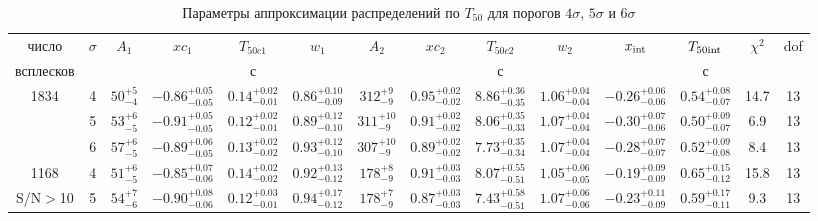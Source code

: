 \begin{table} [h]
 \centering
 \caption{Параметры аппроксимации распределений по $T_{50}$ для порогов 
          $4\sigma$, $5\sigma$ и $6\sigma$}\label{tab:T50_distr}
\scriptsize
  \begin{center}
  \begin{tabular}{c c c c c c c c c c c c c c}
  \hline
  \hline
число & $\sigma$ & $A_1$ & $xc_1$ & $T_{50c1}$ & $w_1$ & 
                             $A_2$ & $xc_2$ & $T_{50c2}$ & $w_2$ & 
							 $x_{{\mathrm{int}}}$ & $T_{50{\mathrm{int}}}$ & $\chi^2$ & dof \\
							 
всплесков & & & & с & & & & с & & &  с & & \\
\hline
1834 & 4 & $     50 ^{+     5}_{-     4}$ & $  -0.86 ^{+  0.05}_{-  0.05}$ & $   0.14 ^{+  0.02}_{-  0.01}$ & $   0.86 ^{+  0.10}_{-  0.09}$ & $    312 ^{+     9}_{-     9}$ & $   0.95 ^{+  0.02}_{-  0.02}$ & $   8.86 ^{+  0.36}_{-  0.35}$ & $   1.06 ^{+  0.04}_{-  0.04}$ & $  -0.26 ^{+  0.06}_{-  0.06}$ & $  0.54 ^{+ 0.08}_{- 0.07}$ &   14.7 & 13 \\ 
& 5 & $     53 ^{+     6}_{-     5}$ & $  -0.91 ^{+  0.05}_{-  0.05}$ & $   0.12 ^{+  0.02}_{-  0.01}$ & $   0.89 ^{+  0.12}_{-  0.10}$ & $    311 ^{+    10}_{-     9}$ & $   0.91 ^{+  0.02}_{-  0.02}$ & $   8.06 ^{+  0.35}_{-  0.33}$ & $   1.07 ^{+  0.04}_{-  0.04}$ & $  -0.30 ^{+  0.07}_{-  0.06}$ & $  0.50 ^{+ 0.09}_{- 0.07}$ &    6.9 & 13 \\ 
& 6 & $     57 ^{+     6}_{-     5}$ & $  -0.89 ^{+  0.06}_{-  0.05}$ & $   0.13 ^{+  0.02}_{-  0.02}$ & $   0.93 ^{+  0.12}_{-  0.10}$ & $    307 ^{+    10}_{-     9}$ & $   0.89 ^{+  0.02}_{-  0.02}$ & $   7.73 ^{+  0.35}_{-  0.34}$ & $   1.07 ^{+  0.04}_{-  0.04}$ & $  -0.28 ^{+  0.07}_{-  0.07}$ & $  0.52 ^{+ 0.09}_{- 0.08}$ &    8.4 & 13 \\ 
1168 &4 & $     51 ^{+     6}_{-     5}$ & $  -0.85 ^{+  0.07}_{-  0.06}$ & $   0.14 ^{+  0.02}_{-  0.02}$ & $   0.92 ^{+  0.13}_{-  0.12}$ & $    178 ^{+     8}_{-     9}$ & $   0.91 ^{+  0.03}_{-  0.03}$ & $   8.07 ^{+  0.55}_{-  0.51}$ & $   1.05 ^{+  0.06}_{-  0.05}$ & $  -0.19 ^{+  0.09}_{-  0.09}$ & $  0.65 ^{+ 0.15}_{- 0.12}$ &   15.8 & 13 \\ 
S/N$>$10 &  5 & $     54 ^{+     7}_{-     6}$ & $  -0.90 ^{+  0.08}_{-  0.06}$ & $   0.12 ^{+  0.03}_{-  0.01}$ & $   0.94 ^{+  0.17}_{-  0.12}$ & $    178 ^{+     7}_{-     9}$ & $   0.87 ^{+  0.03}_{-  0.03}$ & $   7.43 ^{+  0.58}_{-  0.51}$ & $   1.07 ^{+  0.06}_{-  0.06}$ & $  -0.23 ^{+  0.11}_{-  0.09}$ & $  0.59 ^{+ 0.17}_{- 0.11}$ &    9.3 & 13 \\ 

\end{tabular}
\end{center}
\end{table}
